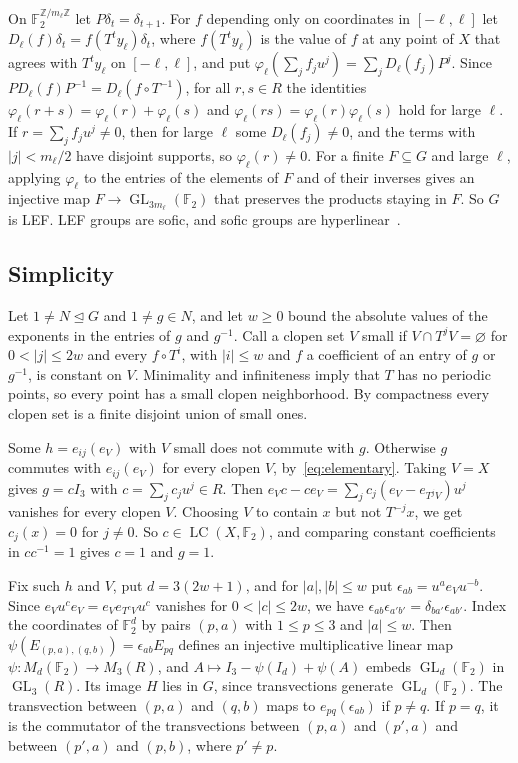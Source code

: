 \documentclass[11pt]{amsart}
\newcommand{\F}{\mathbb F}
\newcommand{\Z}{\mathbb Z}
\newcommand{\LC}{\operatorname{LC}}
\newcommand{\GL}{\operatorname{GL}}
\begin{document}
On $\F_2^{\Z/m_\ell\Z}$ let $P\delta_t=\delta_{t+1}$. For $f$ depending
only on coordinates in $[-\ell,\ell]$ let
$D_\ell(f)\delta_t=f(T^ty_\ell)\delta_t$, where $f(T^ty_\ell)$ is the value
of $f$ at any point of $X$ that agrees with $T^ty_\ell$ on $[-\ell,\ell]$,
and put $\varphi_\ell(\sum_jf_ju^j)=\sum_jD_\ell(f_j)P^j$. Since
$PD_\ell(f)P^{-1}=D_\ell(f\circ T^{-1})$, for all $r,s\in R$ the identities
$\varphi_\ell(r+s)=\varphi_\ell(r)+\varphi_\ell(s)$ and
$\varphi_\ell(rs)=\varphi_\ell(r)\varphi_\ell(s)$ hold for large $\ell$. If
$r=\sum_jf_ju^j\ne0$, then for large $\ell$ some $D_\ell(f_j)\ne0$, and the
terms with $|j|<m_\ell/2$ have disjoint supports, so $\varphi_\ell(r)\ne0$.
For a finite $F\subseteq G$ and large $\ell$, applying $\varphi_\ell$ to the
entries of the elements of $F$ and of their inverses gives an injective
map $F\to\GL_{3m_\ell}(\F_2)$ that preserves the products staying in $F$.
So $G$ is LEF. LEF groups are sofic, and sofic groups are
hyperlinear~\cite[Example~4.5 and Theorem~3.3]{Pestov}.

\subsection*{Simplicity}
Let $1\ne N\trianglelefteq G$ and $1\ne g\in N$, and let $w\ge0$ bound
the absolute values of the exponents in the entries of $g$ and $g^{-1}$.
Call a clopen set $V$ small if $V\cap T^jV=\varnothing$ for
$0<|j|\le2w$ and every $f\circ T^i$, with $|i|\le w$ and $f$ a
coefficient of an entry of $g$ or $g^{-1}$, is constant on $V$.
Minimality and infiniteness imply that $T$ has no periodic points, so
every point has a small clopen neighborhood. By compactness every clopen
set is a finite disjoint union of small ones.

Some $h=e_{ij}(e_V)$ with $V$ small does not commute with $g$.
Otherwise $g$ commutes with $e_{ij}(e_V)$ for every clopen $V$,
by~\eqref{eq:elementary}. Taking $V=X$ gives $g=cI_3$ with
$c=\sum_jc_ju^j\in R$. Then $e_Vc-ce_V=\sum_jc_j(e_V-e_{T^jV})u^j$
vanishes for every clopen $V$. Choosing $V$ to contain $x$ but not
$T^{-j}x$, we get $c_j(x)=0$ for $j\ne0$. So $c\in\LC(X,\F_2)$, and
comparing constant coefficients in $cc^{-1}=1$ gives $c=1$ and $g=1$.

Fix such $h$ and $V$, put $d=3(2w+1)$, and for $|a|,|b|\le w$ put
$\epsilon_{ab}=u^ae_Vu^{-b}$. Since $e_Vu^ce_V=e_Ve_{T^cV}u^c$ vanishes
for $0<|c|\le2w$, we have
$\epsilon_{ab}\epsilon_{a'b'}=\delta_{ba'}\epsilon_{ab'}$. Index the
coordinates of $\F_2^d$ by pairs $(p,a)$ with $1\le p\le3$ and
$|a|\le w$. Then $\psi(E_{(p,a),(q,b)})=\epsilon_{ab}E_{pq}$ defines an
injective multiplicative linear map $\psi:M_d(\F_2)\to M_3(R)$, and
$A\mapsto I_3-\psi(I_d)+\psi(A)$ embeds $\GL_d(\F_2)$ in $\GL_3(R)$. Its
image $H$ lies in $G$, since transvections generate $\GL_d(\F_2)$. The
transvection between $(p,a)$ and $(q,b)$ maps to $e_{pq}(\epsilon_{ab})$
if $p\ne q$. If $p=q$, it is the commutator of the transvections between
$(p,a)$ and $(p',a)$ and between $(p',a)$ and $(p,b)$, where $p'\ne p$.
\end{document}
